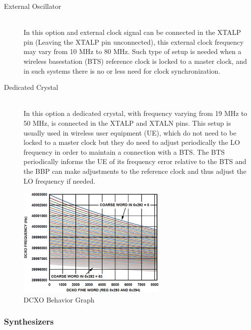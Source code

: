 \begin{description}
	\item[External Oscillator] \hfill \\
	In this option and external clock signal can be connected in the XTALP pin
(Leaving the XTALP pin unconnected), this external clock frequency may vary from
10 MHz to 80 MHz. Such type of setup is needed when a wireless basestation (BTS)
reference clock is locked to a master clock, and in such systems there is no or
less need for clock synchronization.

	\item[Dedicated Crystal] \hfill \\
	In this option a dedicated crystal, with frequency varying from 19 MHz to 50
MHz, is connected in the XTALP and XTALN pins. This setup is usually used in
wireless user equipment (UE), which do not need to be locked to a master clock
but they do need to adjust periodically the LO frequency in order to maintain a
connection with a BTS. The BTS periodically informs the UE of its frequency
error relative to the BTS and the BBP can make adjustments to the reference
clock and thus adjust the LO frequency if needed.

\end{description}

\begin{figure}[htbp]
    \centering
    \includegraphics[width=0.65\textwidth]{./figures/dcxo_graph}
    \caption{ DCXO Behavior Graph
    \label{fig:pll}}
\end{figure}

\subsubsection{Synthesizers}

